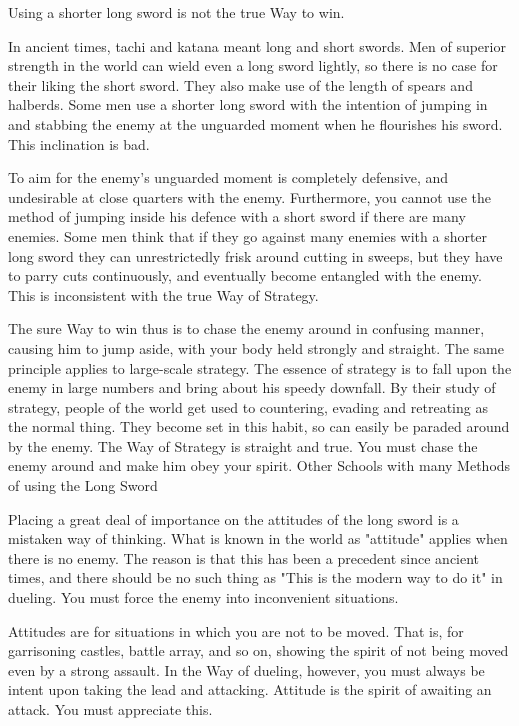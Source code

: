 Using a shorter long sword is not the true Way to win.

In ancient times, tachi and katana meant long and short swords. Men of superior strength in the world can wield even a long sword lightly, so there is no case for their liking the short sword. They also make use of the length of spears and halberds. Some men use a shorter long sword with the intention of jumping in and stabbing the enemy at the unguarded moment when he flourishes his sword. This inclination is bad.

To aim for the enemy's unguarded moment is completely defensive, and undesirable at close quarters with the enemy. Furthermore, you cannot use the method of jumping inside his defence with a short sword if there are many enemies. Some men think that if they go against many enemies with a shorter long sword they can unrestrictedly frisk around cutting in sweeps, but they have to parry cuts continuously, and eventually become entangled with the enemy. This is inconsistent with the true Way of Strategy.

The sure Way to win thus is to chase the enemy around in confusing manner, causing him to jump aside, with your body held strongly and straight. The same principle applies to large-scale strategy. The essence of strategy is to fall upon the enemy in large numbers and bring about his speedy downfall. By their study of strategy, people of the world get used to countering, evading and retreating as the normal thing. They become set in this habit, so can easily be paraded around by the enemy. The Way of Strategy is straight and true. You must chase the enemy around and make him obey your spirit.
Other Schools with many Methods of using the Long Sword

Placing a great deal of importance on the attitudes of the long sword is a mistaken way of thinking. What is known in the world as "attitude" applies when there is no enemy. The reason is that this has been a precedent since ancient times, and there should be no such thing as "This is the modern way to do it" in dueling. You must force the enemy into inconvenient situations.

Attitudes are for situations in which you are not to be moved. That is, for garrisoning castles, battle array, and so on, showing the spirit of not being moved even by a strong assault. In the Way of dueling, however, you must always be intent upon taking the lead and attacking. Attitude is the spirit of awaiting an attack. You must appreciate this.

